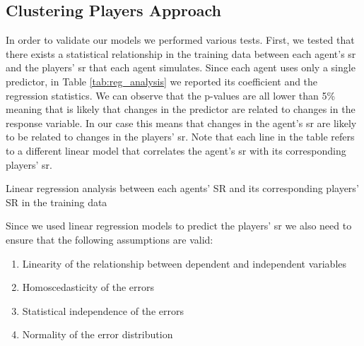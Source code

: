 \subsection{Clustering Players Approach}

In order to validate our models we performed various tests.
First, we tested that there exists a statistical relationship in the training data between each agent's \acs{sr} and the players' \acs{sr} that each agent simulates. Since each agent uses only a single predictor, in Table \ref{tab:reg_analysis} we reported its coefficient and the regression statistics. We can observe that the p-values are all lower than 5\% meaning that is likely that changes in the predictor are related to changes in the response variable. In our case this means that changes in the agent's \acs{sr} are likely to be related to changes in the players' \acs{sr}. Note that each line in the table refers to a different linear model that correlates the agent's \acs{sr} with its corresponding players' \acs{sr}. 
\begin{table}[h]
    \centering
    \small
    \caption{Linear regression analysis between each agents' SR and its corresponding players' SR in the training data} 
    
    \label{tab:reg_analysis}
\end{table} 

Since we used linear regression models to predict the players' \acs{sr} we also need to ensure that the following assumptions are valid:
\begin{enumerate}
    \item Linearity of the relationship between dependent and independent variables
    \item Homoscedasticity of the errors
    \item Statistical independence of the errors
    \item Normality of the error distribution
\end{enumerate}

